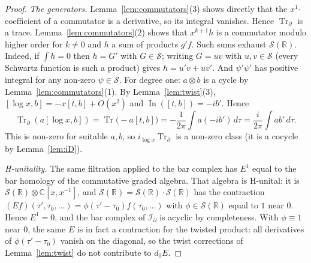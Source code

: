 \documentclass[11pt,oneside,reqno]{article}
\DeclareMathOperator{\Tr}{Tr}
\DeclareMathOperator{\In}{In}
\newcommand{\C}{\mathbb C}
\newcommand{\R}{\mathbb R}
\newcommand{\cS}{\mathcal S}
\newcommand{\Id}{\mathcal I_\partial}
\newcommand{\Trd}{\Tr_\partial}
\newcommand{\bTr}{\overline{\Tr}}
\newcommand{\lx}{\log x}
\theoremstyle{plain}
\theoremstyle{definition}
\theoremstyle{remark}
\begin{document}
\begin{proof}
\emph{The generators.} Lemma~\ref{lem:commutators}(3) shows directly that
the \(x^1\)-coefficient of a commutator is a derivative, so its integral
vanishes. Hence \(\Trd\) is a trace. Lemma~\ref{lem:commutators}(2) shows
that \(x^{k+1}h\) is a commutator modulo higher order for \(k\ne0\) and
\(h\) a sum of products \(g'f\). Such sums exhaust \(\cS(\R)\). Indeed, if
\(\int h=0\) then \(h=G'\) with \(G\in\cS\); writing \(G=uv\) with
\(u,v\in\cS\) (every Schwartz function is such a product) gives
\(h=u'v+uv'\). And \(\psi'\psi'\) has positive integral for any non-zero
\(\psi\in\cS\). For degree one: \(a\otimes b\)
is a cycle by Lemma~\ref{lem:commutators}(1). By Lemma~\ref{lem:twist}(3),
\([\lx,b]=-x[t,b]+O(x^2)\) and \(\In([t,b])=-ib'\). Hence
\[
 \Trd(a[\lx,b])=\bTr\bigl(-a[t,b]\bigr)=-\frac1{2\pi}\int a(-ib')\,d\tau
 =\frac i{2\pi}\int ab'\,d\tau .
\]
This is non-zero for suitable \(a,b\), so \(i_{\lx}\Trd\) is a non-zero
class (it is a cocycle by Lemma~\ref{lem:iD}).

\emph{H-unitality.} The same filtration applied to the bar complex has
\(E^1\) equal to the bar homology of the commutative graded algebra. That
algebra is H-unital: it is \(\cS(\R)\otimes\C[x,x^{-1}]\), and
\(\cS(\R)=\cS(\R)\cdot\cS(\R)\) has the contraction
\((Ef)(\tau',\tau_0,\dots)=\phi(\tau'-\tau_0)f(\tau_0,\dots)\) with
\(\phi\in\cS(\R)\) equal to \(1\) near \(0\). Hence \(E^1=0\), and the bar
complex of \(\Id\) is acyclic by completeness. With \(\phi\equiv1\) near
\(0\), the same \(E\) is in fact a contraction for the twisted product:
all derivatives of \(\phi(\tau'-\tau_0)\) vanish on the diagonal, so the
twist corrections of Lemma~\ref{lem:twist} do not contribute to
\(d_0E\).
\end{proof}
\end{document}
